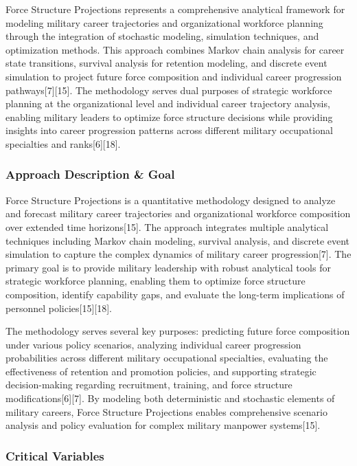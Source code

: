 \documentclass[main.tex]{subfiles}
\begin{document}
Force Structure Projections represents a comprehensive analytical framework for modeling military career trajectories and organizational workforce planning through the integration of stochastic modeling, simulation techniques, and optimization methods. This approach combines Markov chain analysis for career state transitions, survival analysis for retention modeling, and discrete event simulation to project future force composition and individual career progression pathways[7][15]. The methodology serves dual purposes of strategic workforce planning at the organizational level and individual career trajectory analysis, enabling military leaders to optimize force structure decisions while providing insights into career progression patterns across different military occupational specialties and ranks[6][18].

\subsubsection{Approach Description \& Goal}

Force Structure Projections is a quantitative methodology designed to analyze and forecast military career trajectories and organizational workforce composition over extended time horizons[15]. The approach integrates multiple analytical techniques including Markov chain modeling, survival analysis, and discrete event simulation to capture the complex dynamics of military career progression[7]. The primary goal is to provide military leadership with robust analytical tools for strategic workforce planning, enabling them to optimize force structure composition, identify capability gaps, and evaluate the long-term implications of personnel policies[15][18]. 

The methodology serves several key purposes: predicting future force composition under various policy scenarios, analyzing individual career progression probabilities across different military occupational specialties, evaluating the effectiveness of retention and promotion policies, and supporting strategic decision-making regarding recruitment, training, and force structure modifications[6][7]. By modeling both deterministic and stochastic elements of military careers, Force Structure Projections enables comprehensive scenario analysis and policy evaluation for complex military manpower systems[15].

\subsubsection{Critical Variables}
\end{document}
